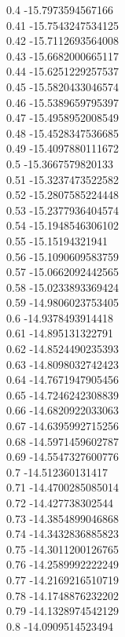 {0.4	-15.7973594567166\\
0.41	-15.7543247534125\\
0.42	-15.7112693564008\\
0.43	-15.6682000665117\\
0.44	-15.6251229257537\\
0.45	-15.5820433046574\\
0.46	-15.5389659795397\\
0.47	-15.4958952008549\\
0.48	-15.4528347536685\\
0.49	-15.4097880111672\\
0.5	-15.3667579820133\\
0.51	-15.3237473522582\\
0.52	-15.2807585224448\\
0.53	-15.2377936404574\\
0.54	-15.1948546306102\\
0.55	-15.15194321941\\
0.56	-15.1090609583759\\
0.57	-15.0662092442565\\
0.58	-15.0233893369424\\
0.59	-14.9806023753405\\
0.6	-14.9378493914418\\
0.61	-14.895131322791\\
0.62	-14.8524490235393\\
0.63	-14.8098032742423\\
0.64	-14.7671947905456\\
0.65	-14.7246242308839\\
0.66	-14.6820922033063\\
0.67	-14.6395992715256\\
0.68	-14.5971459602787\\
0.69	-14.5547327600776\\
0.7	-14.512360131417\\
0.71	-14.4700285085014\\
0.72	-14.427738302544\\
0.73	-14.3854899046868\\
0.74	-14.3432836885823\\
0.75	-14.3011200126765\\
0.76	-14.2589992222249\\
0.77	-14.2169216510719\\
0.78	-14.1748876232202\\
0.79	-14.1328974542129\\
0.8	-14.0909514523494\\
}
